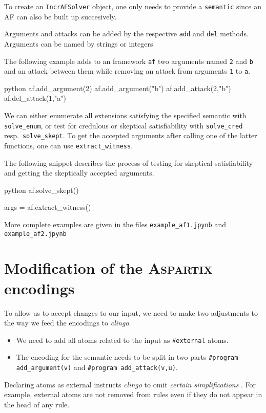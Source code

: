 \documentclass[oneside,12pt]{amsart}
\begin{document}
To create an \texttt{IncrAFSolver} object, one only needs to provide 
a \texttt{semantic} since an AF can also be built up succesively.

Arguments and attacks can be added by the respective \texttt{add}
and \texttt{del} methods. Arguments can be named by strings
or integers

The following example adds to an framework \texttt{af}
two arguments named \texttt{2} and \texttt{b} and an attack between
them while removing an attack from arguments \texttt{1} to \texttt{a}.
\begin{mintedbox}{python}
af.add_argument(2)
af.add_argument("b")
af.add_attack(2,"b")
af.del_attack(1,"a")\end{mintedbox}

We can either enumerate all extensions satisfying the specified semantic with 
\texttt{solve\_enum}, or test for credulous or skeptical satisfiability 
with \texttt{solve\_cred} resp.\ \texttt{solve\_skept}. To get the accepted arguments
after calling one of the latter functions, one can use \texttt{extract\_witness}.

The following snippet describes the process of testing for skeptical satisfiability
and getting the skeptically accepted arguments.
\begin{mintedbox}{python}
af.solve_skept()

args = af.extract_witness()\end{mintedbox}

More complete examples are given in the files \texttt{example\_af1.jpynb} and \texttt{example\_af2.jpynb}

\section{Modification of the \textsc{Aspartix} encodings}\label{incr-semantics}
To allow us to accept changes to our input, we need to make two adjustments
to the way we feed the encodings to \emph{clingo}.
\begin{itemize}
    \item We need to add all atoms related to the input as \texttt{\#external} atoms.
    \item The encoding for the semantic needs to be split in two parts 
        \texttt{\#program add\_argument(v)} and \texttt{\#program add\_attack(v,u)}.
\end{itemize}

Declaring atoms as external instructs \emph{clingo} to omit \emph{certain simplifications}
\cite[3.1.15]{clingo_guide}. For example, external atoms are not removed from rules 
even if they do not appear in the head of any rule. 
\end{document}
